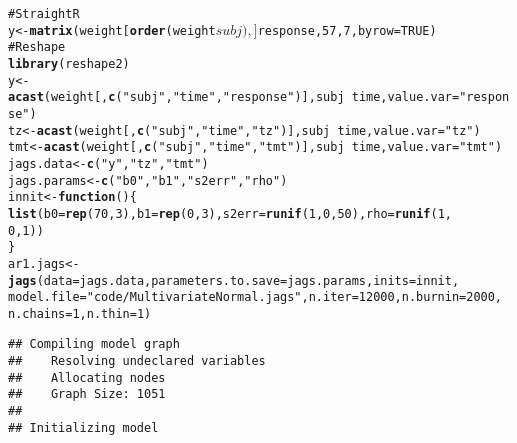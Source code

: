 \documentclass[12pt,letterpaper,oneside]{article}\usepackage{graphicx, color}
\makeatletter
\newcommand{\hlfunctioncall}[1]{\textcolor[rgb]{0.501960784313725,0,0.329411764705882}{\textbf{#1}}}%
\newcommand{\hlstring}[1]{\textcolor[rgb]{0.6,0.6,1}{#1}}%
\newcommand{\hlcomment}[1]{\textcolor[rgb]{0.180392156862745,0.6,0.341176470588235}{#1}}%
\newenvironment{kframe}{%
 \def\at@end@of@kframe{}%
 \ifinner\ifhmode%
  \def\at@end@of@kframe{\end{minipage}}%
  \begin{minipage}{\columnwidth}%
 \fi\fi%
 \def\FrameCommand##1{\hskip\@totalleftmargin \hskip-\fboxsep
 \colorbox{shadecolor}{##1}\hskip-\fboxsep
     \hskip-\linewidth \hskip-\@totalleftmargin \hskip\columnwidth}%
 \MakeFramed {\advance\hsize-\width
   \@totalleftmargin\z@ \linewidth\hsize
   \@setminipage}}%
 {\par\unskip\endMakeFramed%
 \at@end@of@kframe}
\newenvironment{knitrout}{}{} %
\makeatother
\begin{document}
\begin{knitrout}\scriptsize
{}\color{fgcolor}\begin{kframe}
\begin{alltt}
\hlcomment{# Straight R}
y <- \hlfunctioncall{matrix}(weight[\hlfunctioncall{order}(weight$subj), ]$response, 57, 7, byrow = TRUE)
\hlcomment{# Reshape}
\hlfunctioncall{library}(reshape2)
y <- \hlfunctioncall{acast}(weight[, \hlfunctioncall{c}(\hlstring{"subj"}, \hlstring{"time"}, \hlstring{"response"})], subj ~ time, value.var = \hlstring{"response"})
tz <- \hlfunctioncall{acast}(weight[, \hlfunctioncall{c}(\hlstring{"subj"}, \hlstring{"time"}, \hlstring{"tz"})], subj ~ time, value.var = \hlstring{"tz"})
tmt <- \hlfunctioncall{acast}(weight[, \hlfunctioncall{c}(\hlstring{"subj"}, \hlstring{"time"}, \hlstring{"tmt"})], subj ~ time, value.var = \hlstring{"tmt"})
jags.data <- \hlfunctioncall{c}(\hlstring{"y"}, \hlstring{"tz"}, \hlstring{"tmt"})
jags.params <- \hlfunctioncall{c}(\hlstring{"b0"}, \hlstring{"b1"}, \hlstring{"s2err"}, \hlstring{"rho"})
innit <- \hlfunctioncall{function}() \{
    \hlfunctioncall{list}(b0 = \hlfunctioncall{rep}(70, 3), b1 = \hlfunctioncall{rep}(0, 3), s2err = \hlfunctioncall{runif}(1, 0, 50), rho = \hlfunctioncall{runif}(1, 
        0, 1))
\}
ar1.jags <- \hlfunctioncall{jags}(data = jags.data, parameters.to.save = jags.params, inits = innit, 
    model.file = \hlstring{"code/MultivariateNormal.jags"}, n.iter = 12000, n.burnin = 2000, 
    n.chains = 1, n.thin = 1)
\end{alltt}
\begin{verbatim}
## Compiling model graph
##    Resolving undeclared variables
##    Allocating nodes
##    Graph Size: 1051
## 
## Initializing model
\end{verbatim}
\end{kframe}
\end{knitrout}
\end{document}
